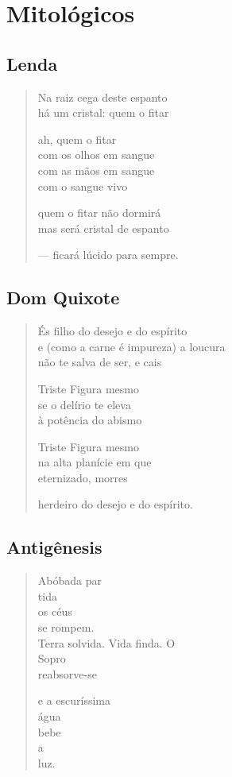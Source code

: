 \part*{Mitológicos}

\chapter{Lenda}

\begin{verse}
Na raiz cega deste espanto\\
há um cristal: quem o fitar

ah, quem o fitar\\
com os olhos em sangue\\
com as mãos em sangue\\
com o sangue vivo

quem o fitar não dormirá\\
mas será cristal de espanto

--- ficará lúcido para sempre.
\end{verse}

\chapter{Dom Quixote}

\begin{verse}
És filho do desejo e do espírito\\
e (como a carne é impureza) a loucura\\
não te salva de ser, e cais

Triste Figura mesmo\\
se o delírio te eleva\\
à potência do abismo

Triste Figura mesmo\\
na alta planície em que\\
eternizado, morres

herdeiro do desejo e do espírito.
\end{verse}

\chapter{Antigênesis}

\begin{verse}
Abóbada par\\
tida\\
os céus\\
se rompem.\\
Terra solvida. Vida finda. O\\
Sopro\\
reabsorve-se

e a escuríssima\\
água\\
bebe\\
a\\
luz.
\end{verse}

